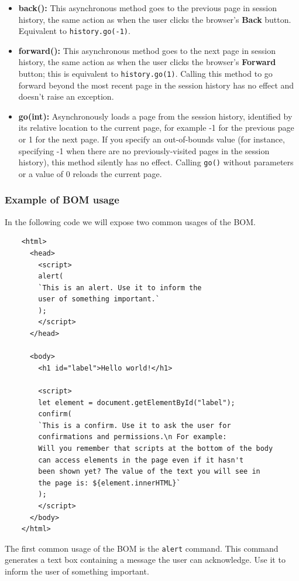 \documentclass{scrbook}
\begin{document}
	\begin{itemize}
		\item \textbf{back():} This asynchronous method goes to the previous page in session history, the same action as when the user clicks the browser's \textbf{Back} button. Equivalent to \texttt{history.go(-1)}.
		
		\item \textbf{forward():} This asynchronous method goes to the next page in session history, the same action as when the user clicks the browser's \textbf{Forward} button; this is equivalent to \texttt{history.go(1)}. Calling this method to go forward beyond the most recent page in the session history has no effect and doesn't raise an exception.
		
		\item \textbf{go(int):} Asynchronously loads a page from the session history, identified by its relative location to the current page, for example -1 for the previous page or 1 for the next page. If you specify an out-of-bounds value (for instance, specifying -1 when there are no previously-visited pages in the session history), this method silently has no effect. Calling \texttt{go()} without parameters or a value of 0 reloads the current page.
	\end{itemize}
	
	\subsubsection{Example of BOM usage}
	
	In the following code we will expose two common usages of the BOM.
	
	\begin{lstlisting}
	<html>
	  <head>
		<script>
		alert(
		`This is an alert. Use it to inform the
		user of something important.`
		);
		</script>
	  </head>
		
	  <body>
		<h1 id="label">Hello world!</h1>
			
		<script>
		let element = document.getElementById("label");
		confirm(
		`This is a confirm. Use it to ask the user for 
		confirmations and permissions.\n For example: 
		Will you remember that scripts at the bottom of the body
		can access elements in the page even if it hasn't 
		been shown yet? The value of the text you will see in 
		the page is: ${element.innerHTML}`
		);
		</script>
	  </body>
	</html>
	\end{lstlisting}
	
	The first common usage of the BOM is the \texttt{alert} command. This command generates a text box containing a message the user can acknowledge. Use it to inform the user of something important.\\
	
\end{document}
